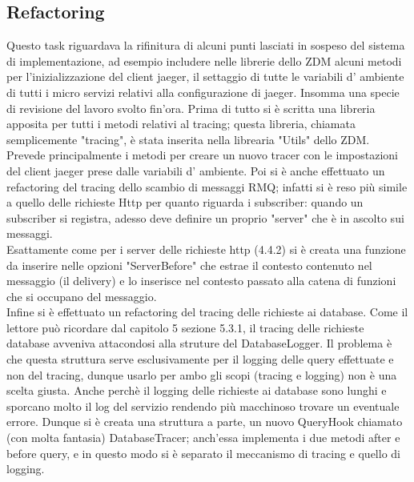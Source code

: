 \documentclass[a4paper,12pt,titlepage,italian,openany]{report}
\begin{document}
\subsection{Refactoring}
Questo task riguardava la rifinitura di alcuni punti lasciati in sospeso del sistema di implementazione, ad esempio includere nelle librerie dello ZDM\cite{zdm:1} alcuni metodi per l'inizializzazione del client jaeger, il settaggio di tutte le variabili d' ambiente di tutti i micro servizi relativi alla configurazione di jaeger.
Insomma una specie di revisione del lavoro svolto fin'ora.
Prima di tutto si è scritta una libreria apposita per tutti i metodi relativi al tracing; questa libreria, chiamata semplicemente "tracing", 
è stata inserita nella librearia "Utils" dello ZDM\cite{zdm:1}.
Prevede principalmente i metodi per creare un nuovo tracer con le impostazioni del client jaeger prese dalle variabili d' ambiente.
Poi si è anche effettuato un refactoring del tracing dello scambio di messaggi RMQ; infatti si è reso più simile a quello delle
 richieste Http per quanto riguarda i subscriber: quando un subscriber si registra, adesso deve definire un proprio "server" che è in ascolto sui messaggi.\\
Esattamente come per i server delle richieste http (4.4.2) si
è creata una funzione da inserire nelle opzioni "ServerBefore" che estrae il contesto contenuto nel messaggio (il delivery)
 e lo inserisce nel contesto passato alla catena di funzioni che si occupano del messaggio.
 \\Infine si è effettuato un refactoring del tracing delle richieste ai database. Come il lettore può ricordare dal capitolo 5 sezione 5.3.1, il tracing delle richieste database avveniva attacondosi alla struture del DatabaseLogger. Il problema è che 
 questa struttura serve esclusivamente per il logging delle query effettuate e non del tracing, dunque usarlo per ambo gli scopi (tracing e logging) non è una scelta giusta. Anche perchè il logging delle richieste ai database sono lunghi e sporcano molto il log del servizio rendendo più macchinoso trovare un eventuale errore.
 Dunque si è creata una struttura a parte, un nuovo QueryHook chiamato (con molta fantasia) DatabaseTracer; anch'essa implementa i due metodi after e before query, e in questo modo si è separato il meccanismo di tracing e quello di logging.
 
\end{document}
